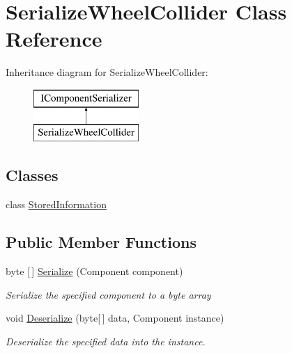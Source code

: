 \hypertarget{class_serialize_wheel_collider}{}\section{Serialize\+Wheel\+Collider Class Reference}
\label{class_serialize_wheel_collider}
Inheritance diagram for Serialize\+Wheel\+Collider\+:\begin{figure}[H]
\begin{center}
\leavevmode
\includegraphics[height=2.000000cm]{class_serialize_wheel_collider}
\end{center}
\end{figure}
\subsection*{Classes}
\begin{DoxyCompactItemize}
\item 
class \hyperlink{class_serialize_wheel_collider_1_1_stored_information}{Stored\+Information}
\end{DoxyCompactItemize}
\subsection*{Public Member Functions}
\begin{DoxyCompactItemize}
\item 
byte \mbox{[}$\,$\mbox{]} \hyperlink{class_serialize_wheel_collider_aeecc61865e7331afb0436aae4f53dc4d}{Serialize} (Component component)
\begin{DoxyCompactList}\small\item\em Serialize the specified component to a byte array \end{DoxyCompactList}\item 
void \hyperlink{class_serialize_wheel_collider_aa0fb4372a07823644b82f0fc968b4fcf}{Deserialize} (byte\mbox{[}$\,$\mbox{]} data, Component instance)
\begin{DoxyCompactList}\small\item\em Deserialize the specified data into the instance. \end{DoxyCompactList}\end{DoxyCompactItemize}


